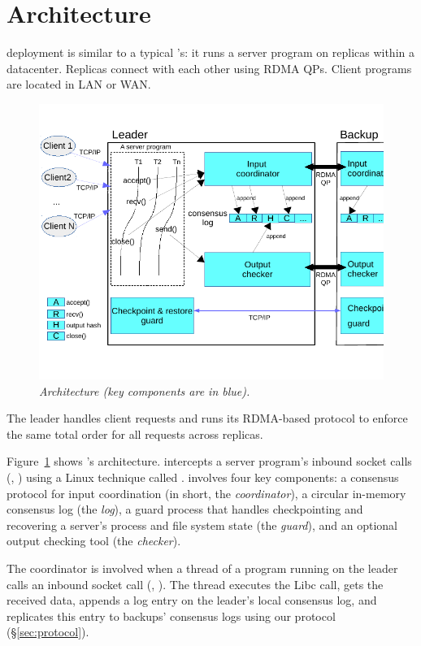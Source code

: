 \section{Architecture} \label{sec:arch}

\xxx deployment is similar to a typical \smr's: it runs a server program on 
replicas within a datacenter. Replicas connect with each other using RDMA QPs. 
Client programs are located in LAN or WAN.

\begin{figure}[ht]
\begin{center}
\includegraphics{figures/arch}
\caption{\em \xxx Architecture (key components are in
  blue).}\label{fig:arch}
\end{center}
\end{figure}

The \xxx leader handles client requests and runs its RDMA-based protocol to 
enforce the same total order for all requests across replicas.

Figure~\ref{fig:arch} shows \xxx's architecture. \xxx intercepts a server 
program's inbound socket calls (\eg, \recv) using a Linux technique called 
\ldpreload. \xxx involves four key components: a \paxos consensus protocol for 
input coordination (in short, the \emph{coordinator}), a circular in-memory 
consensus log (the \emph{log}), a guard process that handles checkpointing 
and recovering a server's process and file system state (the 
\emph{guard}), and an optional output checking tool (the \emph{checker}).

The coordinator is involved when a thread of a program running on the \xxx 
leader calls an inbound socket call (\eg, \recv). The thread executes the 
Libc call, gets the received data, appends a log entry on the leader's local 
consensus log, and replicates this entry to backups' consensus logs using our 
\paxos protocol (\S\ref{sec:protocol}).

